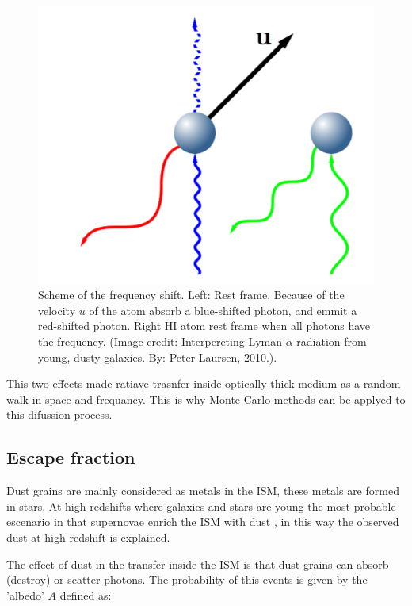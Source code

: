 \begin{figure}[H]\label{fig:xshift}
\begin{center}
\includegraphics[scale=0.4]{../Figures/xshift.png}
\end{center}\caption{Scheme of the frequency shift. Left: Rest frame, Because 
of the velocity $u$ of the atom absorb a blue-shifted \ly photon, and emmit 
a red-shifted \ly photon. Right HI atom rest frame when all photons have the \ly frequency. (Image credit: Interpereting Lyman $\alpha$ radiation from young, dusty galaxies. By: Peter Laursen, 2010.).}
\end{figure}


This two effects made ratiave trasnfer inside optically thick medium as a random 
walk in space and frequancy. This is why Monte-Carlo methods can be
applyed to this difussion process.
 
\subsection{Escape fraction}

Dust grains are mainly considered as metals in the ISM, these
metals are formed in stars. At high redshifts where galaxies and 
stars are young the most probable escenario in that supernovae 
enrich the ISM with dust \citep{Kotak09}, in this way the observed 
dust \citep{Coppin09}  at high redshift is explained. 

The effect of dust in the \ly transfer inside the ISM is that 
dust grains can absorb (destroy) or scatter \ly photons. The 
probability of this events is given by the 'albedo' $A$ defined as:


